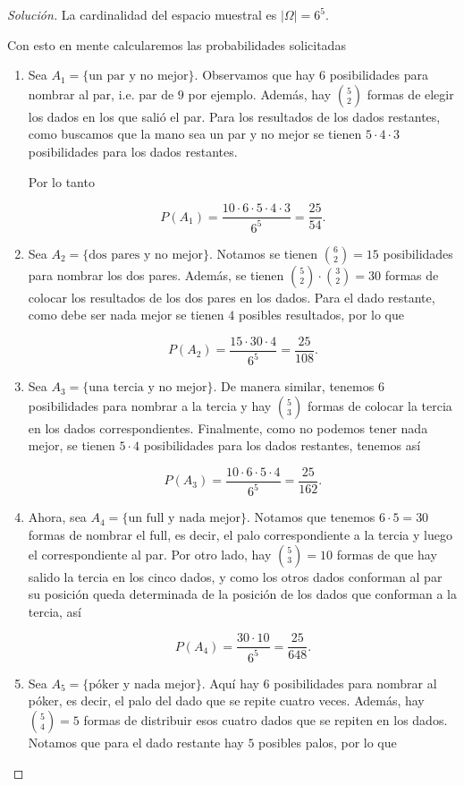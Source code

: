 \documentclass{article}
\renewcommand{\P}[1]{P\left(#1\right)}
\begin{document}
\begin{enumerate}
\begin{proof}[Solución]
La cardinalidad del espacio muestral es $|\Omega|=6^5$.

Con esto en mente calcularemos las probabilidades solicitadas

\begin{enumerate}
    \item Sea $A_1=\{\text{un par y no mejor}\}$. Observamos que hay $6$ posibilidades para nombrar al par, i.e. par de $9$ por ejemplo. Además, hay $\binom{5}{2}$ formas de elegir los dados en los que salió el par. Para los resultados de los dados restantes, como buscamos que la mano sea un par y no mejor se tienen $5\cdot 4\cdot 3$ posibilidades para los dados restantes. 
    
    Por lo tanto 

    \[\P{A_1}=\frac{10\cdot 6\cdot 5\cdot 4\cdot 3}{6^5}=\frac{25}{54}.\]
    
    \item Sea $A_2=\{\text{dos pares y no mejor}\}$. Notamos se tienen $\binom{6}{2}=15$ posibilidades para nombrar los dos pares. Además, se tienen $\binom{5}{2}\cdot\binom{3}{2}=30$ formas de colocar los resultados de los dos pares en los dados. Para el dado restante, como debe ser nada mejor se tienen $4$ posibles resultados, por lo que 
    
    \[\P{A_2}=\frac{15\cdot 30\cdot 4}{6^5}=\frac{25}{108}.\]
    
    \item Sea $A_3=\{\text{una tercia y no mejor}\}$. De manera similar, tenemos $6$ posibilidades para nombrar a la tercia y hay $\binom{5}{3}$ formas de colocar la tercia en los dados correspondientes. Finalmente, como no podemos tener nada mejor, se tienen $5\cdot 4$ posibilidades para los dados restantes, tenemos así
    
    \[\P{A_3}=\frac{10\cdot 6\cdot 5\cdot 4}{6^5}=\frac{25}{162}.\]
    
    \item Ahora, sea $A_4=\{\text{un full y nada mejor}\}$. Notamos que tenemos $6\cdot 5=30$ formas de nombrar el full, es decir, el palo correspondiente a la tercia y luego el correspondiente al par. Por otro lado, hay $\binom{5}{3}=10$ formas de que hay salido la tercia en los cinco dados, y como los otros dados conforman al par su posición queda determinada de la posición de los dados que conforman a la tercia, así
    
    \[\P{A_4}=\frac{30\cdot 10}{6^5}=\frac{25}{648}.\]
    
    \item Sea $A_5=\{\text{póker y nada mejor}\}$. Aquí hay $6$ posibilidades para nombrar al póker, es decir, el palo del dado que se repite cuatro veces. Además, hay $\binom{5}{4}=5$ formas de distribuir esos cuatro dados que se repiten en los dados. Notamos que para el dado restante hay $5$ posibles palos, por lo que
    

\end{enumerate}
\end{proof}
\end{enumerate}
\end{document}

